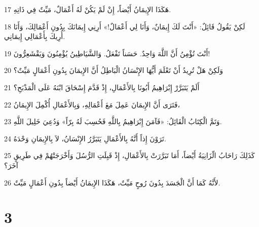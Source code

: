 \par 17 هَكَذَا الإِيمَانُ أَيْضاً، إِنْ لَمْ يَكُنْ لَهُ أَعْمَالٌ، مَيِّتٌ فِي ذَاتِهِ.
\par 18 لَكِنْ يَقُولُ قَائِلٌ: «أَنْتَ لَكَ إِيمَانٌ، وَأَنَا لِي أَعْمَالٌ!» أَرِنِي إِيمَانَكَ بِدُونِ أَعْمَالِكَ، وَأَنَا أُرِيكَ بِأَعْمَالِي إِيمَانِي.
\par 19 أَنْتَ تُؤْمِنُ أَنَّ اللَّهَ وَاحِدٌ. حَسَناً تَفْعَلُ. وَالشَّيَاطِينُ يُؤْمِنُونَ وَيَقْشَعِرُّونَ!
\par 20 وَلَكِنْ هَلْ تُرِيدُ أَنْ تَعْلَمَ أَيُّهَا الإِنْسَانُ الْبَاطِلُ أَنَّ الإِيمَانَ بِدُونِ أَعْمَالٍ مَيِّتٌ؟
\par 21 أَلَمْ يَتَبَرَّرْ إِبْرَاهِيمُ أَبُونَا بِالأَعْمَالِ، إِذْ قَدَّمَ إِسْحَاقَ ابْنَهُ عَلَى الْمَذْبَحِ؟
\par 22 فَتَرَى أَنَّ الإِيمَانَ عَمِلَ مَعَ أَعْمَالِهِ، وَبِالأَعْمَالِ أُكْمِلَ الإِيمَانُ،
\par 23 وَتَمَّ الْكِتَابُ الْقَائِلُ: «فَآمَنَ إِبْرَاهِيمُ بِاللَّهِ فَحُسِبَ لَهُ بِرّاً» وَدُعِيَ خَلِيلَ اللَّهِ.
\par 24 تَرَوْنَ إِذاً أَنَّهُ بِالأَعْمَالِ يَتَبَرَّرُ الإِنْسَانُ، لاَ بِالإِيمَانِ وَحْدَهُ.
\par 25 كَذَلِكَ رَاحَابُ الّزَانِيَةُ أَيْضاً، أَمَا تَبَرَّرَتْ بِالأَعْمَالِ، إِذْ قَبِلَتِ الرُّسُلَ وَأَخْرَجَتْهُمْ فِي طَرِيقٍ آخَرَ؟
\par 26 لأَنَّهُ كَمَا أَنَّ الْجَسَدَ بِدُونَ رُوحٍ مَيِّتٌ، هَكَذَا الإِيمَانُ أَيْضاً بِدُونِ أَعْمَالٍ مَيِّتٌ.

\chapter{3}

